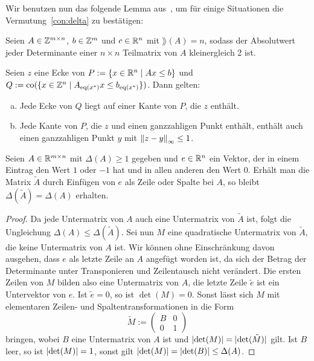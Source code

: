 Wir benutzen nun das folgende Lemma aus~\cite[Theorem 2 und Beweis]{VESELOV2009220}, um für einige Situationen die Vermutung~\ref{con:delta} zu bestätigen:
\begin{lemma}\label{lem:veselov}
	Seien $A\in\mathbb{Z}^{m\times n}$, $b\in\mathbb{Z}^m$ und $c\in\mathbb{R}^n$ mit $\rang(A)=n$, sodass der Absolutwert jeder Determinante einer $n\times n$ Teilmatrix von $A$ kleinergleich 2 ist.
	
	Seien $z$ eine Ecke von $P:=\{x\in\mathbb{R}^n\mid Ax\leq b \}$ und $Q:=\operatorname{co}(\{x\in\mathbb{Z}^n \mid A_{\operatorname{eq}(x^*)}x \leq b_{\operatorname{eq}(x^*)} \})$.
	Dann gelten:
	\begin{enumerate}[(a)]
		\item Jede Ecke von $Q$ liegt auf einer Kante von $P$, die $z$ enthält.
		\item Jede Kante von $P$, die $z$ und einen ganzzahligen Punkt enthält, enthält auch einen ganzzahligen Punkt $y$ mit $\left\lVert z -y\right\rVert_\infty\leq 1$.
	\end{enumerate}
\end{lemma}
\begin{lemma}\label{lem:same-delta}
	Seien $A\in\mathbb{R}^{m\times n}$ mit $\Delta(A)\geq 1$ gegeben und $e\in\mathbb{R}^n$ ein Vektor, der in einem Eintrag den Wert $1$ oder $-1$ hat und in allen anderen den Wert $0$.
	Erhält man die Matrix $\tilde{A}$ durch Einfügen von $e$ als Zeile oder Spalte bei $A$, so bleibt $\Delta(\tilde{A})=\Delta(A)$ erhalten.
\end{lemma}
\begin{proof}
	Da jede Untermatrix von $A$ auch eine Untermatrix von $\tilde{A}$ ist, folgt die Ungleichung $\Delta(A)\leq\Delta(\tilde{A})$.
	Sei nun $M$ eine quadratische Untermatrix von $\tilde{A}$, die keine Untermatrix von $A$ ist.
	Wir können ohne Einschränkung davon ausgehen, dass $e$ als letzte Zeile an $A$ angefügt worden ist, da sich der Betrag der Determinante unter Transponieren und Zeilentausch nicht verändert.
	Die ersten Zeilen von $M$ bilden also eine Untermatrix von $A$, die letzte Zeile $\tilde{e}$ ist ein Untervektor von $e$.
	Ist $\tilde{e}=0$, so ist $\det(M)=0$.
	Sonst lässt sich $M$ mit elementaren Zeilen- und Spaltentransformationen in die Form $$\tilde{M}:= \begin{pmatrix}
		B & 0 \\
		0 & 1
	\end{pmatrix}$$ bringen, wobei $B$ eine Untermatrix von $A$ ist und $\lvert \det(M) \rvert=\lvert \det(\tilde{M}) \rvert$ gilt.
	Ist $B$ leer, so ist $\lvert \det(M) \rvert=1$, sonst gilt $\lvert \det(M) \rvert=\lvert \det(B) \rvert\leq\Delta(A)$.
\end{proof}

